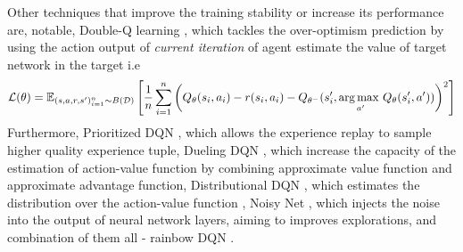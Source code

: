 
Other techniques that improve the training stability or increase its performance are, notable, Double-Q learning \cite{van2016deep}, which tackles the over-optimism prediction by using the action output of \textit{current iteration} of agent estimate the value of target network in the target i.e
\begin{equation}
    \mathcal{L}(\theta) = \mathbb{E}_{(s, a, r, s')^n_{i=1} \sim B(\mathcal{D})}\left[  \frac{1}{n}\sum^n_{i=1} \left( Q_{\theta}(s_i, a_i) - r(s_i, a_i) - Q_{\theta^-}(s'_i, \underset{a'}{\arg\max \ } Q_\theta(s'_i, a')) \right)^2  \right]
\end{equation}
Furthermore, Prioritized DQN \cite{schaul2015prioritized}, which allows the experience replay to sample higher quality experience tuple, Dueling DQN \cite{wang2015dueling}, which increase the capacity of the estimation of action-value function by combining approximate value function and approximate advantage function, Distributional DQN \cite{bellemare2017distributional}, which estimates the distribution over the action-value function \cite{osband2018randomized}, Noisy Net \cite{fortunato2017noisy}, which injects the noise into the output of neural network layers, aiming to improves explorations, and combination of them all - rainbow DQN \cite{hessel2018rainbow}.

